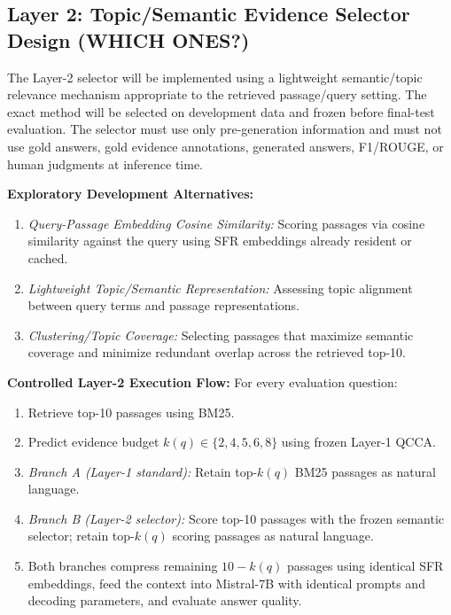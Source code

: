 \documentclass[11pt,a4paper]{article}
\begin{document}
\subsection{Layer 2: Topic/Semantic Evidence Selector Design (WHICH ONES?)}
\begin{statusbox}
The Layer-2 selector will be implemented using a lightweight semantic/topic relevance mechanism appropriate to the retrieved passage/query setting. The exact method will be selected on development data and frozen before final-test evaluation. The selector must use only pre-generation information and must not use gold answers, gold evidence annotations, generated answers, F1/ROUGE, or human judgments at inference time.
\end{statusbox}

\noindent\textbf{Exploratory Development Alternatives:}
\begin{enumerate}
    \item \textit{Query-Passage Embedding Cosine Similarity:} Scoring passages via cosine similarity against the query using SFR embeddings already resident or cached.
    \item \textit{Lightweight Topic/Semantic Representation:} Assessing topic alignment between query terms and passage representations.
    \item \textit{Clustering/Topic Coverage:} Selecting passages that maximize semantic coverage and minimize redundant overlap across the retrieved top-10.
\end{enumerate}

\noindent\textbf{Controlled Layer-2 Execution Flow:}
For every evaluation question:
\begin{enumerate}
    \item Retrieve top-10 passages using BM25.
    \item Predict evidence budget $k(q) \in \{2, 4, 5, 6, 8\}$ using frozen Layer-1 QCCA.
    \item \textit{Branch A (Layer-1 standard):} Retain top-$k(q)$ BM25 passages as natural language.
    \item \textit{Branch B (Layer-2 selector):} Score top-10 passages with the frozen semantic selector; retain top-$k(q)$ scoring passages as natural language.
    \item Both branches compress remaining $10 - k(q)$ passages using identical SFR embeddings, feed the context into Mistral-7B with identical prompts and decoding parameters, and evaluate answer quality.
\end{enumerate}
\end{document}
